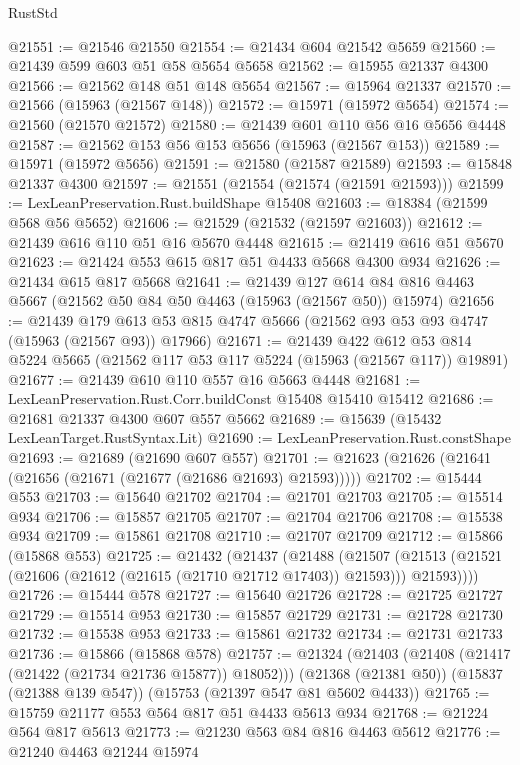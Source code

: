 \begin{lexlean}{RustStd}
\begin{coremodule}
{\begin{coremodule}
{{{{{{{{{{{{{{{{{{{{{{{{{{{{{{{{{{{{{{{{{{{{{{{{{{{{{{{{{{{{@21551 := @21546 @21550
@21554 := @21434 @604 @21542 @5659
@21560 := @21439 @599 @603 @51 @58 @5654 @5658
@21562 := @15955 @21337 @4300
@21566 := @21562 @148 @51 @148 @5654
@21567 := @15964 @21337
@21570 := @21566 (@15963 (@21567 @148))
@21572 := @15971 (@15972 @5654)
@21574 := @21560 (@21570 @21572)
@21580 := @21439 @601 @110 @56 @16 @5656 @4448
@21587 := @21562 @153 @56 @153 @5656 (@15963 (@21567 @153))
@21589 := @15971 (@15972 @5656)
@21591 := @21580 (@21587 @21589)
@21593 := @15848 @21337 @4300
@21597 := @21551 (@21554 (@21574 (@21591 @21593)))
@21599 := LexLeanPreservation.Rust.buildShape @15408
@21603 := @18384 (@21599 @568 @56 @5652)
@21606 := @21529 (@21532 (@21597 @21603))
@21612 := @21439 @616 @110 @51 @16 @5670 @4448
@21615 := @21419 @616 @51 @5670
@21623 := @21424 @553 @615 @817 @51 @4433 @5668 @4300 @934
@21626 := @21434 @615 @817 @5668
@21641 := @21439
    @127
    @614
    @84
    @816
    @4463
    @5667
    (@21562 @50 @84 @50 @4463 (@15963 (@21567 @50)) @15974)
@21656 := @21439
    @179
    @613
    @53
    @815
    @4747
    @5666
    (@21562 @93 @53 @93 @4747 (@15963 (@21567 @93)) @17966)
@21671 := @21439
    @422
    @612
    @53
    @814
    @5224
    @5665
    (@21562 @117 @53 @117 @5224 (@15963 (@21567 @117)) @19891)
@21677 := @21439 @610 @110 @557 @16 @5663 @4448
@21681 := LexLeanPreservation.Rust.Corr.buildConst @15408 @15410 @15412
@21686 := @21681 @21337 @4300 @607 @557 @5662
@21689 := @15639 (@15432 LexLeanTarget.RustSyntax.Lit)
@21690 := LexLeanPreservation.Rust.constShape
@21693 := @21689 (@21690 @607 @557)
@21701 := @21623 (@21626 (@21641 (@21656 (@21671 (@21677 (@21686 @21693) @21593)))))
@21702 := @15444 @553
@21703 := @15640 @21702
@21704 := @21701 @21703
@21705 := @15514 @934
@21706 := @15857 @21705
@21707 := @21704 @21706
@21708 := @15538 @934
@21709 := @15861 @21708
@21710 := @21707 @21709
@21712 := @15866 (@15868 @553)
@21725 := @21432
    (@21437
      (@21488
        (@21507 (@21513 (@21521 (@21606 (@21612 (@21615 (@21710 @21712 @17403)) @21593))) @21593))))
@21726 := @15444 @578
@21727 := @15640 @21726
@21728 := @21725 @21727
@21729 := @15514 @953
@21730 := @15857 @21729
@21731 := @21728 @21730
@21732 := @15538 @953
@21733 := @15861 @21732
@21734 := @21731 @21733
@21736 := @15866 (@15868 @578)
@21757 := @21324
    (@21403 (@21408 (@21417 (@21422 (@21734 @21736 @15877)) @18052)))
    (@21368 (@21381 @50))
    (@15837 (@21388 @139 @547))
    (@15753 (@21397 @547 @81 @5602 @4433))
@21765 := @15759 @21177 @553 @564 @817 @51 @4433 @5613 @934
@21768 := @21224 @564 @817 @5613
@21773 := @21230 @563 @84 @816 @4463 @5612
@21776 := @21240 @4463 @21244 @15974
}}}}}}}}}}}}}}}}}}}}}}}}}}}}}}}}}}}}}}}}}}}}}}}}}}}}}}}}}}}}
\end{coremodule}}
\end{coremodule}
\end{lexlean}
